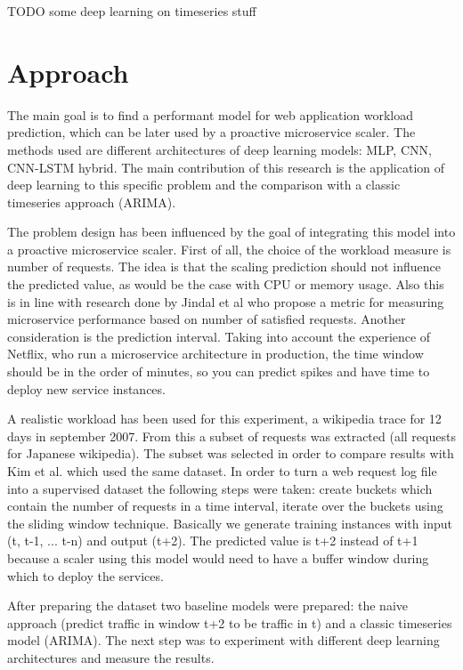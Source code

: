 \documentclass[12pt]{article}
\begin{document}
  TODO some deep learning on timeseries stuff
  
  \section{Approach}
  The main goal is to find a performant model for web application 
  workload prediction, which can be later used by a proactive 
  microservice scaler. The methods used are different architectures
  of deep learning models: MLP, CNN, CNN-LSTM hybrid. The main 
  contribution of this research is the application of deep learning 
  to this specific problem and the comparison with a classic timeseries
  approach (ARIMA).

  The problem design has been influenced by the goal of integrating
  this model into a proactive microservice scaler. First of all,
  the choice of the workload measure is number of requests. The idea
  is that the scaling prediction should not influence the predicted 
  value, as would be the case with CPU or memory usage. Also this is 
  in line with research done by Jindal et al\cite{msc} who propose 
  a metric for measuring microservice performance based on number of 
  satisfied requests. Another consideration is the prediction interval.
  Taking into account the experience of Netflix\cite{scryer}, who run 
  a microservice architecture in production, the time window should be in 
  the order of minutes, so you can predict spikes and have time to deploy
  new service instances.

  A realistic workload has been used for this experiment, a wikipedia 
  trace for 12 days in september 2007. From this a subset of requests was 
  extracted (all requests for Japanese wikipedia). The subset was selected 
  in order to compare results with Kim et al.\cite{CloudInsight} which used 
  the same dataset. In order to turn a web request log file into a supervised 
  dataset the following steps were taken: create buckets which contain the 
  number of requests in a time interval, iterate over the buckets using 
  the sliding window technique\cite{sliding_window}. Basically we generate 
  training instances with input (t, t-1, ... t-n) and output (t+2). The 
  predicted value is t+2 instead of t+1 because a scaler using this model 
  would need to have a buffer window during which to deploy the services.

  After preparing the dataset two baseline models were prepared: the naive 
  approach (predict traffic in window t+2 to be traffic in t) and a classic 
  timeseries model (ARIMA). The next step was to experiment with different 
  deep learning architectures and measure the results.
\end{document}
